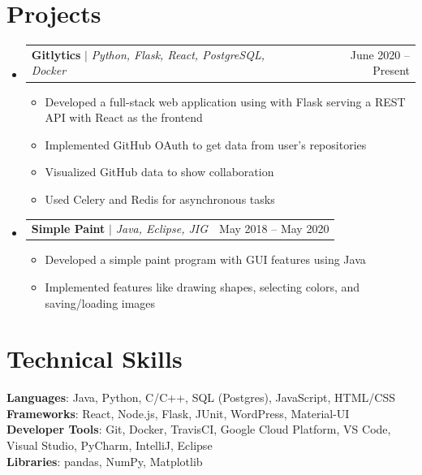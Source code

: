 \documentclass[letterpaper,11pt]{article}
\makeatletter
\newcommand{\resumeItem}[1]{
  \item\small{
    {#1 \vspace{-2pt}}
  }
}
\newcommand{\resumeProjectHeading}[2]{
    \item
    \begin{tabular*}{0.97\textwidth}{l@{\extracolsep{\fill}}r}
      \small#1 & #2 \\
    \end{tabular*}\vspace{-7pt}
}
\newcommand{\resumeSubHeadingListStart}{\begin{itemize}[leftmargin=0.15in, label={}]}
\newcommand{\resumeSubHeadingListEnd}{\end{itemize}}
\newcommand{\resumeItemListStart}{\begin{itemize}}
\newcommand{\resumeItemListEnd}{\end{itemize}\vspace{-5pt}}
\makeatother
\begin{document}
\section{Projects}
    \resumeSubHeadingListStart
      \resumeProjectHeading
          {\textbf{Gitlytics} $|$ \emph{Python, Flask, React, PostgreSQL, Docker}}{June 2020 -- Present}
          \resumeItemListStart
            \resumeItem{Developed a full-stack web application using with Flask serving a REST API with React as the frontend}
            \resumeItem{Implemented GitHub OAuth to get data from user's repositories}
            \resumeItem{Visualized GitHub data to show collaboration}
            \resumeItem{Used Celery and Redis for asynchronous tasks}
          \resumeItemListEnd
      \resumeProjectHeading
          {\textbf{Simple Paint} $|$ \emph{Java, Eclipse, JIG}}{May 2018 -- May 2020}
          \resumeItemListStart
            \resumeItem{Developed a simple paint program with GUI features using Java}
            \resumeItem{Implemented features like drawing shapes, selecting colors, and saving/loading images}
          \resumeItemListEnd
    \resumeSubHeadingListEnd



\section{Technical Skills}
 \begin{itemize}[leftmargin=0.15in, label={}]
    \small{\item{
     \textbf{Languages}{: Java, Python, C/C++, SQL (Postgres), JavaScript, HTML/CSS} \\
     \textbf{Frameworks}{: React, Node.js, Flask, JUnit, WordPress, Material-UI} \\
     \textbf{Developer Tools}{: Git, Docker, TravisCI, Google Cloud Platform, VS Code, Visual Studio, PyCharm, IntelliJ, Eclipse} \\
     \textbf{Libraries}{: pandas, NumPy, Matplotlib}
    }}
 \end{itemize}


\end{document}
